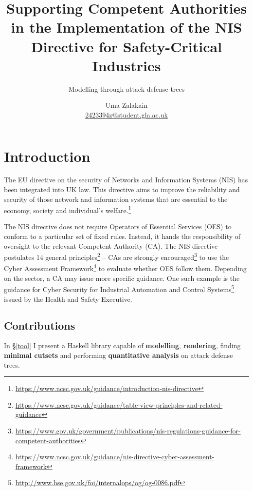 \documentclass{scrreprt}
\begin{document}
\title{Supporting Competent Authorities in the Implementation of the NIS
Directive for Safety-Critical Industries}
\subtitle{Modelling through attack-defense trees}
\author{Uma Zalakain \\ \href{mailto:2423394z@student.gla.ac.uk}{2423394z@student.gla.ac.uk}}

{\let\newpage\relax\maketitle}
\doclicenseThis
\newpage

\setcounter{tocdepth}{2}
\tableofcontents
\newpage
{}

\chapter{Introduction}

The EU directive on the security of Networks and Information Systems (NIS) has
been integrated into UK law. This directive aims to improve the reliability and
security of those network and information systems that are essential to the
economy, society and individual's
welfare.\footnote{\url{https://www.ncsc.gov.uk/guidance/introduction-nis-directive}}

The NIS directive does not require Operators of Essential Services (OES) to
conform to a particular set of fixed rules. Instead, it hands the responsibility
of oversight to the relevant Competent Authority (CA). The NIS directive
postulates 14 general
principles\footnote{\url{https://www.ncsc.gov.uk/guidance/table-view-principles-and-related-guidance}}
-- CAs are strongly
encouraged\footnote{\url{https://www.gov.uk/government/publications/nis-regulations-guidance-for-competent-authorities}}
to use the Cyber Assessment
Framework\footnote{\url{https://www.ncsc.gov.uk/guidance/nis-directive-cyber-assessment-framework}}
to evaluate whether OES follow them. Depending on the sector, a CA may issue
more specific guidance. One such example is the guidance for Cyber Security for
Industrial Automation and Control
Systems\footnote{\url{http://www.hse.gov.uk/foi/internalops/og/og-0086.pdf}}
issued by the Health and Safety Executive.

\section{Contributions}

In \S\ref{tool} I present a Haskell library capable of \textbf{modelling},
\textbf{rendering}, finding \textbf{minimal cutsets} and performing
\textbf{quantitative analysis} on attack defense trees.
\end{document}
